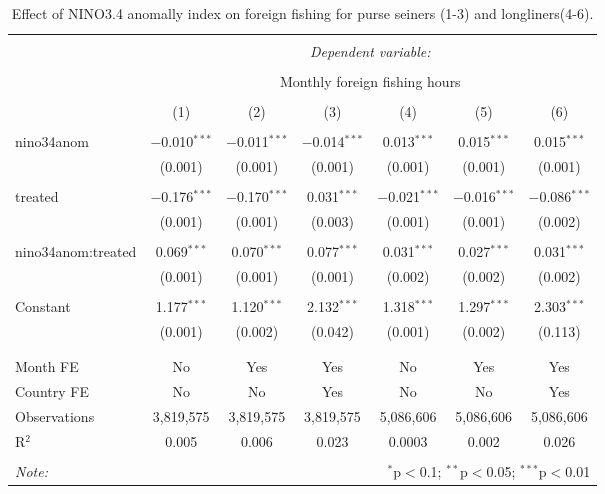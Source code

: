 \begin{table}[!htbp] \centering 
  \caption{\label{tab:ff_reg}Effect of NINO3.4 anomally index on foreign fishing for purse seiners (1-3) and longliners(4-6).} 
  \label{} 
\begin{tabular}{@{\extracolsep{5pt}}lcccccc} 
\\[-1.8ex]\hline 
\hline \\[-1.8ex] 
 & \multicolumn{6}{c}{\textit{Dependent variable:}} \\ 
\cline{2-7} 
\\[-1.8ex] & \multicolumn{6}{c}{Monthly foreign fishing hours} \\ 
\\[-1.8ex] & (1) & (2) & (3) & (4) & (5) & (6)\\ 
\hline \\[-1.8ex] 
 nino34anom & $-$0.010$^{***}$ & $-$0.011$^{***}$ & $-$0.014$^{***}$ & 0.013$^{***}$ & 0.015$^{***}$ & 0.015$^{***}$ \\ 
  & (0.001) & (0.001) & (0.001) & (0.001) & (0.001) & (0.001) \\ 
  & & & & & & \\ 
 treated & $-$0.176$^{***}$ & $-$0.170$^{***}$ & 0.031$^{***}$ & $-$0.021$^{***}$ & $-$0.016$^{***}$ & $-$0.086$^{***}$ \\ 
  & (0.001) & (0.001) & (0.003) & (0.001) & (0.001) & (0.002) \\ 
  & & & & & & \\ 
 nino34anom:treated & 0.069$^{***}$ & 0.070$^{***}$ & 0.077$^{***}$ & 0.031$^{***}$ & 0.027$^{***}$ & 0.031$^{***}$ \\ 
  & (0.001) & (0.001) & (0.001) & (0.002) & (0.002) & (0.002) \\ 
  & & & & & & \\ 
 Constant & 1.177$^{***}$ & 1.120$^{***}$ & 2.132$^{***}$ & 1.318$^{***}$ & 1.297$^{***}$ & 2.303$^{***}$ \\ 
  & (0.001) & (0.002) & (0.042) & (0.001) & (0.002) & (0.113) \\ 
  & & & & & & \\ 
\hline \\[-1.8ex] 
Month FE & No & Yes & Yes & No & Yes & Yes \\ 
Country FE & No & No & Yes & No & No & Yes \\ 
Observations & 3,819,575 & 3,819,575 & 3,819,575 & 5,086,606 & 5,086,606 & 5,086,606 \\ 
R$^{2}$ & 0.005 & 0.006 & 0.023 & 0.0003 & 0.002 & 0.026 \\ 
\hline 
\hline \\[-1.8ex] 
\textit{Note:}  & \multicolumn{6}{r}{$^{*}$p$<$0.1; $^{**}$p$<$0.05; $^{***}$p$<$0.01} \\ 
\end{tabular} 
\end{table} 

